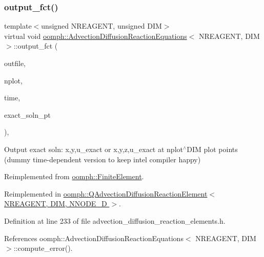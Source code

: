 \subsubsection{\texorpdfstring{output\+\_\+fct()}{output\_fct()}\hspace{0.1cm}{\footnotesize\ttfamily [2/2]}}
{\footnotesize\ttfamily template$<$unsigned N\+R\+E\+A\+G\+E\+NT, unsigned D\+IM$>$ \\
virtual void \hyperlink{classoomph_1_1AdvectionDiffusionReactionEquations}{oomph\+::\+Advection\+Diffusion\+Reaction\+Equations}$<$ N\+R\+E\+A\+G\+E\+NT, D\+IM $>$\+::output\+\_\+fct (\begin{DoxyParamCaption}\item[{std\+::ostream \&}]{outfile,  }\item[{const unsigned \&}]{nplot,  }\item[{const double \&}]{time,  }\item[{\hyperlink{classoomph_1_1FiniteElement_ad4ecf2b61b158a4b4d351a60d23c633e}{Finite\+Element\+::\+Unsteady\+Exact\+Solution\+Fct\+Pt}}]{exact\+\_\+soln\+\_\+pt }\end{DoxyParamCaption})\hspace{0.3cm}{\ttfamily [inline]}, {\ttfamily [virtual]}}



Output exact soln\+: x,y,u\+\_\+exact or x,y,z,u\+\_\+exact at nplot$^\wedge$\+D\+IM plot points (dummy time-\/dependent version to keep intel compiler happy) 



Reimplemented from \hyperlink{classoomph_1_1FiniteElement_a2a8426dccd57b927be0ae0eec00d0479}{oomph\+::\+Finite\+Element}.



Reimplemented in \hyperlink{classoomph_1_1QAdvectionDiffusionReactionElement_aced1d7c07e1e49b95aff9b354676808b}{oomph\+::\+Q\+Advection\+Diffusion\+Reaction\+Element$<$ N\+R\+E\+A\+G\+E\+N\+T, D\+I\+M, N\+N\+O\+D\+E\+\_\+D $>$}.



Definition at line 233 of file advection\+\_\+diffusion\+\_\+reaction\+\_\+elements.\+h.



References oomph\+::\+Advection\+Diffusion\+Reaction\+Equations$<$ N\+R\+E\+A\+G\+E\+N\+T, D\+I\+M $>$\+::compute\+\_\+error().

\mbox{\label{classoomph_1_1AdvectionDiffusionReactionEquations_a26fd863a25ebcff9dfb17ea3fa3c99ee}} 
